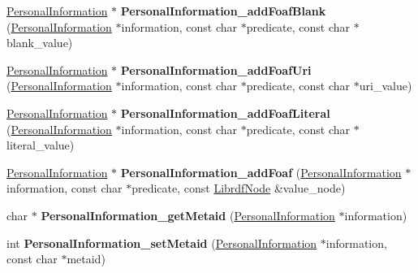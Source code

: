 \begin{DoxyCompactItemize}
\item 
\mbox{\label{namespaceomexmeta_ac131d8bd8df53e89fa1256a0be45358d}} 
\hyperlink{classomexmeta_1_1PersonalInformation}{Personal\+Information} $\ast$ {\bfseries Personal\+Information\+\_\+add\+Foaf\+Blank} (\hyperlink{classomexmeta_1_1PersonalInformation}{Personal\+Information} $\ast$information, const char $\ast$predicate, const char $\ast$blank\+\_\+value)
\item 
\mbox{\label{namespaceomexmeta_a31ecc9357011658fa6785451886a0b64}} 
\hyperlink{classomexmeta_1_1PersonalInformation}{Personal\+Information} $\ast$ {\bfseries Personal\+Information\+\_\+add\+Foaf\+Uri} (\hyperlink{classomexmeta_1_1PersonalInformation}{Personal\+Information} $\ast$information, const char $\ast$predicate, const char $\ast$uri\+\_\+value)
\item 
\mbox{\label{namespaceomexmeta_a692328b7caa5527bf1f5ff86e7077637}} 
\hyperlink{classomexmeta_1_1PersonalInformation}{Personal\+Information} $\ast$ {\bfseries Personal\+Information\+\_\+add\+Foaf\+Literal} (\hyperlink{classomexmeta_1_1PersonalInformation}{Personal\+Information} $\ast$information, const char $\ast$predicate, const char $\ast$literal\+\_\+value)
\item 
\mbox{\label{namespaceomexmeta_a6edcf0c8af06246bb3344ff3f4ea7a21}} 
\hyperlink{classomexmeta_1_1PersonalInformation}{Personal\+Information} $\ast$ {\bfseries Personal\+Information\+\_\+add\+Foaf} (\hyperlink{classomexmeta_1_1PersonalInformation}{Personal\+Information} $\ast$information, const char $\ast$predicate, const \hyperlink{classredland_1_1LibrdfNode}{Librdf\+Node} \&value\+\_\+node)
\item 
\mbox{\label{namespaceomexmeta_aba8bceb7297f33061319f06af29d14ec}} 
char $\ast$ {\bfseries Personal\+Information\+\_\+get\+Metaid} (\hyperlink{classomexmeta_1_1PersonalInformation}{Personal\+Information} $\ast$information)
\item 
\mbox{\label{namespaceomexmeta_ac71f84e1edff4f5023e02a607e9809f4}} 
int {\bfseries Personal\+Information\+\_\+set\+Metaid} (\hyperlink{classomexmeta_1_1PersonalInformation}{Personal\+Information} $\ast$information, const char $\ast$metaid)

\end{DoxyCompactItemize}
